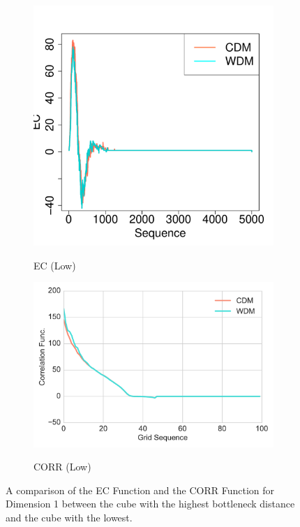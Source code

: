\documentclass[12pt]{article}
\begin{document}
\begin{figure}[htp!]
\begin{subfigure}{0.24\textwidth}
    \label{fig:valid2}
  \end{subfigure}
    \begin{subfigure}{0.21\textwidth}
    \centering
        \caption{EC (Low)}
\includegraphics[width=\linewidth]{figure_13_min_margin_2euler.pdf}
    \label{fig:valid3}
  \end{subfigure}
    \begin{subfigure}{0.24\textwidth}
    \centering
        \caption{CORR (Low)}
\includegraphics[width=\linewidth]{figure_13_min_margin_corr.pdf}
    \label{fig:valid4}
  \end{subfigure}
    \label{fig:validationfigs}
    \caption{A comparison of the EC Function and the CORR Function for Dimension 1 between the cube with the highest bottleneck distance and the cube with the lowest.}
\end{figure}
\end{document}
